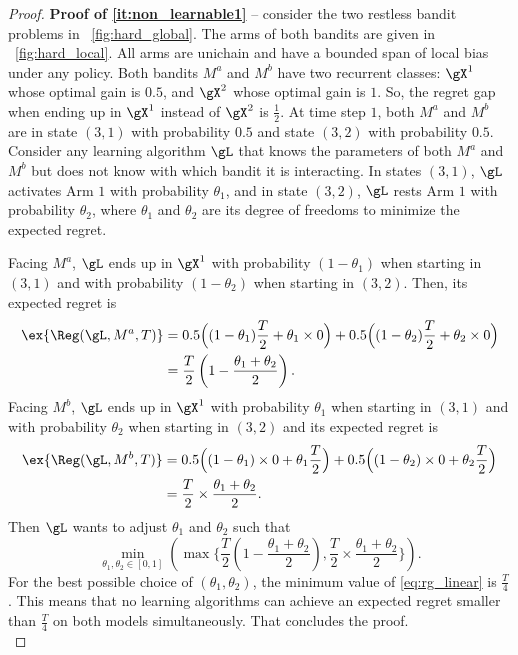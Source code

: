 \begin{proof}
    \textbf{Proof of \ref{it:non_learnable1}} -- consider the two restless bandit problems in \figurename~\ref{fig:hard_global}.
    The arms of both bandits are given in \figurename~\ref{fig:hard_local}.
    All arms are unichain and have a bounded span of local bias under any policy.
    Both bandits $M^a$ and $M^b$ have two recurrent classes: $\gX^1$ whose optimal gain is $0.5$, and $\gX^2$ whose optimal gain is $1$.
    So, the regret gap when ending up in $\gX^1$ instead of $\gX^2$ is $\frac12$.
    At time step $1$, both $M^a$ and $M^b$ are in state $(3,1)$ with probability $0.5$ and state $(3,2)$ with probability $0.5$.
    Consider any learning algorithm $\gL$ that knows the parameters of both $M^a$ and $M^b$ but does not know with which bandit it is interacting.
    In states $(3,1)$, $\gL$ activates Arm $1$ with probability $\theta_1$, and in state $(3,2)$, $\gL$ rests Arm $1$ with probability $\theta_2$, where $\theta_1$ and $\theta_2$ are its degree of freedoms to minimize the expected regret.

    Facing $M^a$, $\gL$ ends up in $\gX^1$ with probability $(1-\theta_1)$ when starting in $(3,1)$ and with probability $(1-\theta_2)$ when starting in $(3,2)$.
    Then, its expected regret is
    \begin{align*}
        \ex{\Reg(\gL,M^a,T)}
        &=0.5\Bigl((1-\theta_1)\frac{T}2 +\theta_1\times 0\Bigr) +0.5\Bigl((1-\theta_2)\frac{T}2 +\theta_2\times 0\Bigr)\\
        &=\frac{T}2\left(1-\frac{\theta_1+\theta_2}2\right).
    \end{align*}
    Facing $M^b$, $\gL$ ends up in $\gX^1$ with probability $\theta_1$ when starting in $(3,1)$ and with probability $\theta_2$ when starting in $(3,2)$ and its expected regret is
    \begin{align*}
        \ex{\Reg(\gL,M^b,T)}
        &=0.5\Bigl((1-\theta_1)\times 0 +\theta_1\frac{T}2\Bigr) +0.5\Bigl((1-\theta_2)\times 0 +\theta_2\frac{T}2\Bigr)\\
        &=\frac{T}2\times\frac{\theta_1+\theta_2}2.
    \end{align*}
    Then $\gL$ wants to adjust $\theta_1$ and $\theta_2$ such that
    \begin{equation}
        \label{eq:rg_linear}
        \min_{\theta_1,\theta_2\in[0,1]}\left(\max\biggl\{\frac{T}2\left(1-\frac{\theta_1+\theta_2}2\right), \frac{T}2\times\frac{\theta_1+\theta_2}2\biggr\}\right).
    \end{equation}
    For the best possible choice of $(\theta_1,\theta_2)$, the minimum value of \eqref{eq:rg_linear} is $\displaystyle\frac{T}4$.
    This means that no learning algorithms can achieve an expected regret smaller than $\frac{T}4$ on both models simultaneously.
    That concludes the proof.
    \medskip \\



\end{proof}
